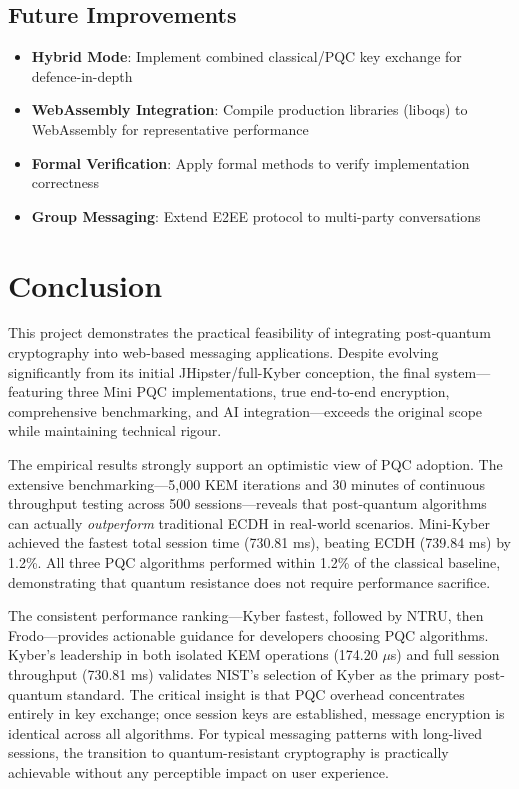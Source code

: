 \documentclass[11pt,a4paper]{article}
\begin{document}
\subsection{Future Improvements}

\begin{itemize}
    \item \textbf{Hybrid Mode}: Implement combined classical/PQC key exchange for defence-in-depth
    \item \textbf{WebAssembly Integration}: Compile production libraries (liboqs) to WebAssembly for representative performance
    \item \textbf{Formal Verification}: Apply formal methods to verify implementation correctness
    \item \textbf{Group Messaging}: Extend E2EE protocol to multi-party conversations
\end{itemize}

\section{Conclusion}

This project demonstrates the practical feasibility of integrating post-quantum cryptography into web-based messaging applications. Despite evolving significantly from its initial JHipster/full-Kyber conception, the final system---featuring three Mini PQC implementations, true end-to-end encryption, comprehensive benchmarking, and AI integration---exceeds the original scope while maintaining technical rigour.

The empirical results strongly support an optimistic view of PQC adoption. The extensive benchmarking---5,000 KEM iterations and 30 minutes of continuous throughput testing across 500 sessions---reveals that post-quantum algorithms can actually \textit{outperform} traditional ECDH in real-world scenarios. Mini-Kyber achieved the fastest total session time (730.81 ms), beating ECDH (739.84 ms) by 1.2\%. All three PQC algorithms performed within 1.2\% of the classical baseline, demonstrating that quantum resistance does not require performance sacrifice.

The consistent performance ranking---Kyber fastest, followed by NTRU, then Frodo---provides actionable guidance for developers choosing PQC algorithms. Kyber's leadership in both isolated KEM operations (174.20 $\mu$s) and full session throughput (730.81 ms) validates NIST's selection of Kyber as the primary post-quantum standard. The critical insight is that PQC overhead concentrates entirely in key exchange; once session keys are established, message encryption is identical across all algorithms. For typical messaging patterns with long-lived sessions, the transition to quantum-resistant cryptography is practically achievable without any perceptible impact on user experience.
\end{document}
